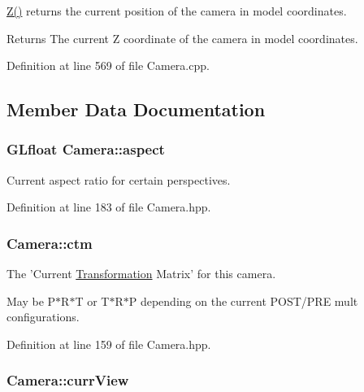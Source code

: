 \hyperlink{class_camera_abf1730e47e8e51c76acbddcaa85e2475}{Z()} returns the current position of the camera in model coordinates. 

\begin{DoxyReturn}{Returns}
The current Z coordinate of the camera in model coordinates. 
\end{DoxyReturn}


Definition at line 569 of file Camera.\-cpp.



\subsection{Member Data Documentation}
\hypertarget{class_camera_af3fdbc52ba0f7af7d8091986d6303119}{
\subsubsection[{aspect}]{\setlength{\rightskip}{0pt plus 5cm}G\-Lfloat Camera\-::aspect\hspace{0.3cm}{\ttfamily [private]}}}\label{class_camera_af3fdbc52ba0f7af7d8091986d6303119}


Current aspect ratio for certain perspectives. 



Definition at line 183 of file Camera.\-hpp.

\hypertarget{class_camera_a9b1e81e3f5531390bb6a599dca0d2444}{
\subsubsection[{ctm}]{ Camera\-::ctm\hspace{0.3cm}{\ttfamily [private]}}}\label{class_camera_a9b1e81e3f5531390bb6a599dca0d2444}


The 'Current \hyperlink{class_transformation}{Transformation} Matrix' for this camera. 

May be P$\ast$\-R$\ast$\-T or T$\ast$\-R$\ast$\-P depending on the current P\-O\-S\-T/\-P\-R\-E mult configurations. 

Definition at line 159 of file Camera.\-hpp.

\hypertarget{class_camera_a1fe2ef68d26bb98f0aa736948304eb64}{
\subsubsection[{curr\-View}]{ Camera\-::curr\-View\hspace{0.3cm}{\ttfamily [private]}}}\label{class_camera_a1fe2ef68d26bb98f0aa736948304eb64}


